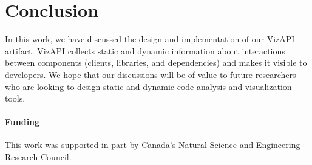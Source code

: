 \section{Conclusion}
In this work, we have discussed the design and implementation of our
VizAPI artifact. VizAPI collects static and dynamic information
about interactions between components (clients, libraries, and dependencies) and makes
it visible to developers. We hope that our discussions will be of value
to future researchers who are looking to design static and dynamic
code analysis and visualization tools. 

\paragraph{Funding} This work was supported in part by Canada's Natural Science and Engineering Research Council.

